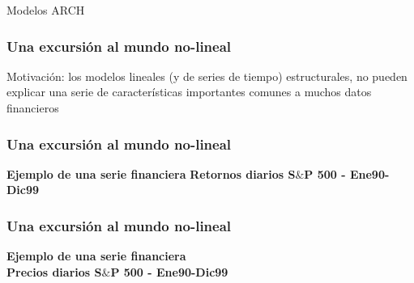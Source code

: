 \documentclass[xcolor=(list of options)]{beamer}
\begin{document}
\begin{section}{Modelos ARCH}
\begin{frame}
\frametitle{Una excursi\'on al mundo no-lineal}

Motivación: los modelos lineales (y de series de tiempo)  estructurales, no pueden explicar una serie de características importantes comunes a muchos datos financieros
\\
 
\end{frame}
\begin{frame}
\frametitle{Una excursi\'on al mundo no-lineal}
\textbf{Ejemplo de una serie financiera}
\textbf{Retornos diarios S$\&$P 500 - Ene90-Dic99}

\vspace{4mm}	



\end{frame}

\begin{frame}
\frametitle{Una excursi\'on al mundo no-lineal}
\textbf{Ejemplo de una serie financiera}\\
\textbf{Precios diarios S$\&$P 500 - Ene90-Dic99}


\end{frame}
\end{section}
\end{document}
